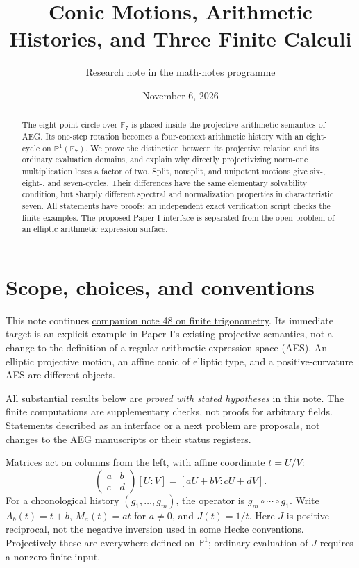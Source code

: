 \documentclass[11pt]{article}
\title{Conic Motions, Arithmetic Histories, and Three Finite Calculi}
\author{Research note in the math-notes programme}
\date{November 6, 2026}
\theoremstyle{definition}
\theoremstyle{remark}
\newcommand{\F}{\mathbb F}
\newcommand{\PP}{\mathbb P}
\begin{document}
\maketitle
\begin{abstract}
The eight-point circle over $\F_7$ is placed inside the projective arithmetic
semantics of AEG. Its one-step rotation becomes a four-context arithmetic
history with an eight-cycle on $\PP^1(\F_7)$. We prove the distinction between
its projective relation and its ordinary evaluation domains, and explain why
directly projectivizing norm-one multiplication loses a factor of two.
Split, nonsplit, and unipotent motions give six-, eight-, and seven-cycles.
Their differences have the same elementary solvability condition, but sharply
different spectral and normalization properties in characteristic seven.
All statements have proofs; an independent exact verification script checks
the finite examples. The proposed Paper I interface is separated from the
open problem of an elliptic arithmetic expression surface.
\end{abstract}
\tableofcontents

\section{Scope, choices, and conventions}
This note continues \href{48-finite-field-trigonometry.pdf}{companion note 48 on finite trigonometry}. Its immediate
target is an explicit example in Paper I's existing projective semantics,
not a change to the definition of a regular arithmetic expression space
(AES). An elliptic projective motion, an affine conic of elliptic type, and
a positive-curvature AES are different objects.

All substantial results below are \emph{proved with stated hypotheses} in
this note. The finite computations are supplementary checks, not proofs for
arbitrary fields. Statements described as an interface or a next problem are
proposals, not changes to the AEG manuscripts or their status registers.

Matrices act on columns from the left, with affine coordinate $t=U/V$:
\[
 \begin{pmatrix}a&b\\c&d\end{pmatrix}[U:V]
   =[aU+bV:cU+dV].
\]
For a chronological history $(g_1,\ldots,g_m)$, the operator is
$g_m\circ\cdots\circ g_1$. Write
$A_b(t)=t+b$, $M_a(t)=at$ for $a\ne0$, and $J(t)=1/t$.
Here $J$ is positive reciprocal, not the negative inversion used in some
Hecke conventions. Projectively these are everywhere defined on $\PP^1$;
ordinary evaluation of $J$ requires a nonzero finite input.
\end{document}
